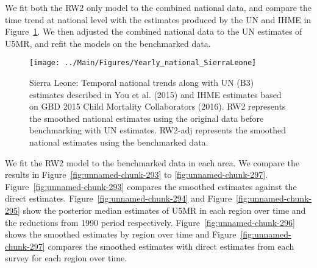\documentclass[12pt]{article}\usepackage[]{graphicx}\usepackage[]{color}
\newenvironment{knitrout}{}{} %
\begin{document}
We fit both the RW2 only model to the combined national data, and compare the time trend at national level with the estimates produced by the UN and IHME in Figure~\ref{fig:unnamed-chunk-292}. We then adjusted the combined national data to the UN estimates of U5MR, and refit the models on the benchmarked data. 

\begin{knitrout}
\color{fgcolor}\begin{figure}[bht]

{\centering \texttt{[image: ../Main/Figures/Yearly\_national\_SierraLeone]} 

}

\caption[Sierra Leone]{Sierra Leone: Temporal national trends along with UN (B3) estimates described in You et al. (2015) and IHME estimates based on GBD 2015 Child Mortality Collaborators (2016). RW2 represents the smoothed national estimates using the original data before benchmarking with UN estimates. RW2-adj represents the smoothed national estimates using the benchmarked data.}\label{fig:unnamed-chunk-292}
\end{figure}


\end{knitrout}
 

We fit the RW2 model to the benchmarked data in each area. 
We compare the results in Figure~\ref{fig:unnamed-chunk-293} to \ref{fig:unnamed-chunk-297}.
Figure~\ref{fig:unnamed-chunk-293} compares the smoothed estimates against the direct estimates. Figure~\ref{fig:unnamed-chunk-294} and Figure~\ref{fig:unnamed-chunk-295} show the posterior median estimates of U5MR in each region over time and the reductions from 1990 period respectively.
Figure~\ref{fig:unnamed-chunk-296} shows the smoothed estimates by region over time and Figure~\ref{fig:unnamed-chunk-297} compares the smoothed estimates with direct estimates from each survey for each region over time.




\end{document}

